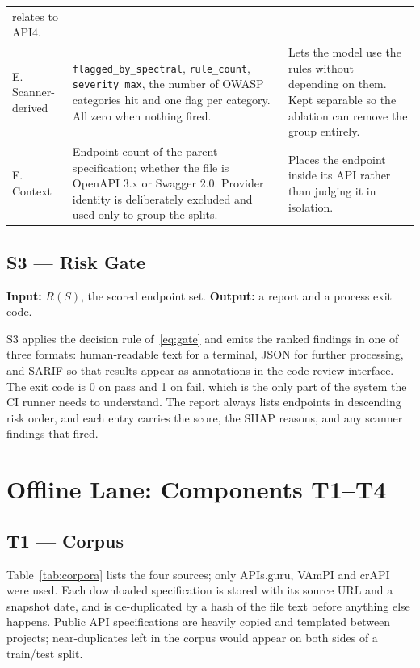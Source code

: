 \documentclass[conference]{IEEEtran}
\begin{document}
\begin{table}[!t]
\begin{tabularx}{\textwidth}{L{2.2cm} Y L{4.6cm}}
relates to API4.\\
E. Scanner-derived & \texttt{flagged\_by\_spectral}, \texttt{rule\_count},
\texttt{severity\_max}, the number of OWASP categories hit and one flag per category. All zero when nothing fired. & Lets the model use the rules
without depending on them. Kept separable so the ablation can remove the group entirely.\\
F. Context & Endpoint count of the parent specification; whether the file is OpenAPI 3.x
or Swagger 2.0. Provider identity is deliberately excluded and used only to group the splits. & Places the endpoint inside its API rather than judging it in
isolation.\\
\bottomrule
\end{tabularx}
\end{table}

\subsection{S3 --- Risk Gate}
\textbf{Input:} $R(S)$, the scored endpoint set. \textbf{Output:} a report and a process exit
code.

S3 applies the decision rule of~\eqref{eq:gate} and emits the ranked findings in one of three
formats: human-readable text for a terminal, JSON for further processing, and SARIF so that
results appear as annotations in the code-review interface. The exit code is 0 on pass and 1
on fail, which is the only part of the system the CI runner needs to understand. The report
always lists endpoints in descending risk order, and each entry carries the score, the SHAP
reasons, and any scanner findings that fired.

\section{Offline Lane: Components T1--T4}

\subsection{T1 --- Corpus}
Table~\ref{tab:corpora} lists the four sources; only APIs.guru, VAmPI and crAPI were used. Each downloaded specification is stored with
its source URL and a snapshot date, and is de-duplicated by a hash of the file text before
anything else happens. Public API specifications are heavily copied and templated between
projects; near-duplicates left in the corpus would appear on both sides of a train/test
split.
\end{document}
